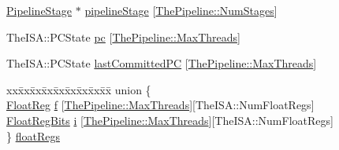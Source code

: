 \begin{DoxyCompactItemize}
\item 
\hyperlink{classPipelineStage}{PipelineStage} $\ast$ \hyperlink{classInOrderCPU_aae220dcd072e514a6cf72df0abf36d42}{pipelineStage} \mbox{[}\hyperlink{namespaceThePipeline_a6918d1731267e5f56969bfb5c240be85}{ThePipeline::NumStages}\mbox{]}
\item 
TheISA::PCState \hyperlink{classInOrderCPU_a61bb24b7355c86288cba2cd9d51ad1ed}{pc} \mbox{[}\hyperlink{namespaceThePipeline_ac9c0bbe9cf27d93e08ea8ccc4096e633}{ThePipeline::MaxThreads}\mbox{]}
\item 
TheISA::PCState \hyperlink{classInOrderCPU_a2a4351147bb2df83bee5c60edc50165f}{lastCommittedPC} \mbox{[}\hyperlink{namespaceThePipeline_ac9c0bbe9cf27d93e08ea8ccc4096e633}{ThePipeline::MaxThreads}\mbox{]}
\item 
\begin{tabbing}
xx\=xx\=xx\=xx\=xx\=xx\=xx\=xx\=xx\=\kill
union \{\\
\>\hyperlink{classInOrderCPU_a75484259f1855aabc8d74c6eb1cfe186}{FloatReg} \hyperlink{classInOrderCPU_a527f4207ae79fbe77bddd111013c163e}{f} \mbox{[}\hyperlink{namespaceThePipeline_ac9c0bbe9cf27d93e08ea8ccc4096e633}{ThePipeline::MaxThreads}\mbox{]}\mbox{[}TheISA::NumFloatRegs\mbox{]}\\
\>\hyperlink{classInOrderCPU_aab5eeae86499f9bfe15ef79360eccc64}{FloatRegBits} \hyperlink{classInOrderCPU_a6a5c774a90c1d03f1cfc418f4c9876e2}{i} \mbox{[}\hyperlink{namespaceThePipeline_ac9c0bbe9cf27d93e08ea8ccc4096e633}{ThePipeline::MaxThreads}\mbox{]}\mbox{[}TheISA::NumFloatRegs\mbox{]}\\
\} \hyperlink{classInOrderCPU_ad85bf1756055c7ee62e445619cdb3750}{floatRegs}\\


\end{tabbing}
\end{DoxyCompactItemize}

